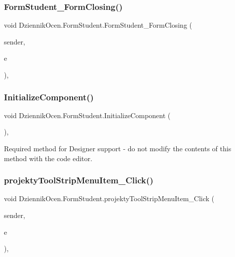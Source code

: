 \subsubsection{\texorpdfstring{Form\+Student\+\_\+\+Form\+Closing()}{FormStudent\_FormClosing()}}
{\footnotesize\ttfamily void Dziennik\+Ocen.\+Form\+Student.\+Form\+Student\+\_\+\+Form\+Closing (\begin{DoxyParamCaption}\item[{object}]{sender,  }\item[{Form\+Closing\+Event\+Args}]{e }\end{DoxyParamCaption})\hspace{0.3cm}{\ttfamily [inline]}, {\ttfamily [private]}}

\mbox{\label{class_dziennik_ocen_1_1_form_student_a52bcdd2774ac5ad7145ad5602d923ad1}} 
\subsubsection{\texorpdfstring{Initialize\+Component()}{InitializeComponent()}}
{\footnotesize\ttfamily void Dziennik\+Ocen.\+Form\+Student.\+Initialize\+Component (\begin{DoxyParamCaption}{ }\end{DoxyParamCaption})\hspace{0.3cm}{\ttfamily [inline]}, {\ttfamily [private]}}



Required method for Designer support -\/ do not modify the contents of this method with the code editor. 

\mbox{\label{class_dziennik_ocen_1_1_form_student_af5850ddba074f1119817ad279db6b326}} 
\subsubsection{\texorpdfstring{projekty\+Tool\+Strip\+Menu\+Item\+\_\+\+Click()}{projektyToolStripMenuItem\_Click()}}
{\footnotesize\ttfamily void Dziennik\+Ocen.\+Form\+Student.\+projekty\+Tool\+Strip\+Menu\+Item\+\_\+\+Click (\begin{DoxyParamCaption}\item[{object}]{sender,  }\item[{Event\+Args}]{e }\end{DoxyParamCaption})\hspace{0.3cm}{\ttfamily [inline]}, {\ttfamily [private]}}

